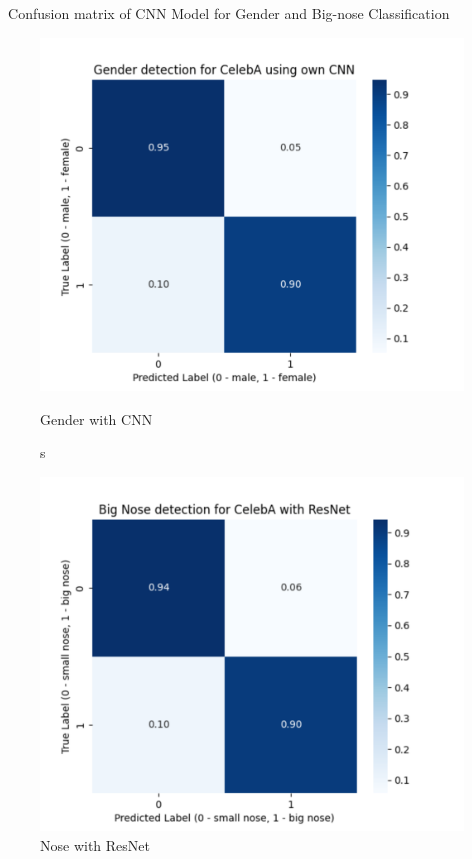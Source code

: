 \documentclass{article}
\begin{document}
\vspace{0.2cm}
\textbf\ Confusion matrix of CNN Model for Gender and Big-nose Classification
\begin{figure}[ht]
    \centering
    \begin{minipage}{0.3\linewidth}
        \centering
        \includegraphics[width=\linewidth]{confusion_matrix_celeba_CNN.png}
        \caption{Gender with CNN}
        \label{fig:first}
    \end{minipage}
    \hspace{0.05\linewidth} s
    \begin{minipage}{0.3\linewidth}
        \centering
        \includegraphics[width=\linewidth]{confusion_matrix_celeba_RESNET.png}
        \caption{Nose with ResNet}
        \label{fig:second}
    \end{minipage}
    \label{fig:side-by-side}
\end{figure}
\end{document}
